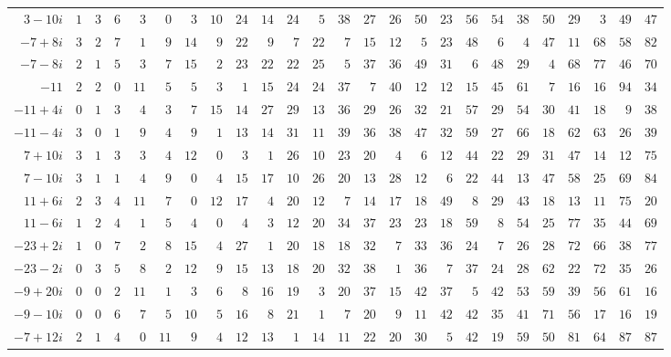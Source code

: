 \begin{longtable}{@{}r|r|r|r|r|r|r|r|r|r|r|r|r|r|r|r|r|r|r|r|r|r|r|r|r@{}}
$3-10i$ & $1$ & $3$ & $6$ & $3$ & $0$ & $3$ & $10$ & $24$ & $14$ & $24$ & $5$ & $38$ & $27$ & $26$ & $50$ & $23$ & $56$ & $54$ & $38$ & $50$ & $29$ & $3$ & $49$ & $47$\\
$-7+8i$ & $3$ & $2$ & $7$ & $1$ & $9$ & $14$ & $9$ & $22$ & $9$ & $7$ & $22$ & $7$ & $15$ & $12$ & $5$ & $23$ & $48$ & $6$ & $4$ & $47$ & $11$ & $68$ & $58$ & $82$\\
$-7-8i$ & $2$ & $1$ & $5$ & $3$ & $7$ & $15$ & $2$ & $23$ & $22$ & $22$ & $25$ & $5$ & $37$ & $36$ & $49$ & $31$ & $6$ & $48$ & $29$ & $4$ & $68$ & $77$ & $46$ & $70$\\
$-11$ & $2$ & $2$ & $0$ & $11$ & $5$ & $5$ & $3$ & $1$ & $15$ & $24$ & $24$ & $37$ & $7$ & $40$ & $12$ & $12$ & $15$ & $45$ & $61$ & $7$ & $16$ & $16$ & $94$ & $34$\\
$-11+4i$ & $0$ & $1$ & $3$ & $4$ & $3$ & $7$ & $15$ & $14$ & $27$ & $29$ & $13$ & $36$ & $29$ & $26$ & $32$ & $21$ & $57$ & $29$ & $54$ & $30$ & $41$ & $18$ & $9$ & $38$\\
$-11-4i$ & $3$ & $0$ & $1$ & $9$ & $4$ & $9$ & $1$ & $13$ & $14$ & $31$ & $11$ & $39$ & $36$ & $38$ & $47$ & $32$ & $59$ & $27$ & $66$ & $18$ & $62$ & $63$ & $26$ & $39$\\
$7+10i$ & $3$ & $1$ & $3$ & $3$ & $4$ & $12$ & $0$ & $3$ & $1$ & $26$ & $10$ & $23$ & $20$ & $4$ & $6$ & $12$ & $44$ & $22$ & $29$ & $31$ & $47$ & $14$ & $12$ & $75$\\
$7-10i$ & $3$ & $1$ & $1$ & $4$ & $9$ & $0$ & $4$ & $15$ & $17$ & $10$ & $26$ & $20$ & $13$ & $28$ & $12$ & $6$ & $22$ & $44$ & $13$ & $47$ & $58$ & $25$ & $69$ & $84$\\
$11+6i$ & $2$ & $3$ & $4$ & $11$ & $7$ & $0$ & $12$ & $17$ & $4$ & $20$ & $12$ & $7$ & $14$ & $17$ & $18$ & $49$ & $8$ & $29$ & $43$ & $18$ & $13$ & $11$ & $75$ & $20$\\
$11-6i$ & $1$ & $2$ & $4$ & $1$ & $5$ & $4$ & $0$ & $4$ & $3$ & $12$ & $20$ & $34$ & $37$ & $23$ & $23$ & $18$ & $59$ & $8$ & $54$ & $25$ & $77$ & $35$ & $44$ & $69$\\
$-23+2i$ & $1$ & $0$ & $7$ & $2$ & $8$ & $15$ & $4$ & $27$ & $1$ & $20$ & $18$ & $18$ & $32$ & $7$ & $33$ & $36$ & $24$ & $7$ & $26$ & $28$ & $72$ & $66$ & $38$ & $77$\\
$-23-2i$ & $0$ & $3$ & $5$ & $8$ & $2$ & $12$ & $9$ & $15$ & $13$ & $18$ & $20$ & $32$ & $38$ & $1$ & $36$ & $7$ & $37$ & $24$ & $28$ & $62$ & $22$ & $72$ & $35$ & $26$\\
$-9+20i$ & $0$ & $0$ & $2$ & $11$ & $1$ & $3$ & $6$ & $8$ & $16$ & $19$ & $3$ & $20$ & $37$ & $15$ & $42$ & $37$ & $5$ & $42$ & $53$ & $59$ & $39$ & $56$ & $61$ & $16$\\
$-9-10i$ & $0$ & $0$ & $6$ & $7$ & $5$ & $10$ & $5$ & $16$ & $8$ & $21$ & $1$ & $7$ & $20$ & $9$ & $11$ & $42$ & $42$ & $35$ & $41$ & $71$ & $56$ & $17$ & $16$ & $19$\\
$-7+12i$ & $2$ & $1$ & $4$ & $0$ & $11$ & $9$ & $4$ & $12$ & $13$ & $1$ & $14$ & $11$ & $22$ & $20$ & $30$ & $5$ & $42$ & $19$ & $59$ & $50$ & $81$ & $64$ & $87$ & $87$\\
\hline\end{longtable}\endgroup
